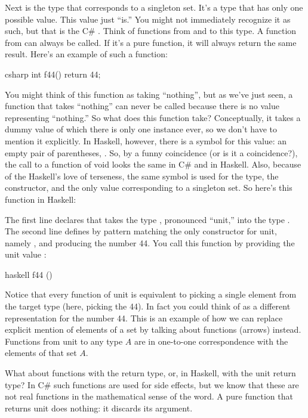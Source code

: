 Next is the type that corresponds to a singleton set. It's a type that
has only one possible value. This value just ``is.'' You might not
immediately recognize it as such, but that is the C\# .
Think of functions from and to this type. A function from 
can always be called. If it's a pure function, it will always return the
same result. Here's an example of such a function:

\begin{snip}{csharp}
int f44() { return 44; }
\end{snip}
You might think of this function as taking ``nothing'', but as we've
just seen, a function that takes ``nothing'' can never be called because
there is no value representing ``nothing.'' So what does this function
take? Conceptually, it takes a dummy value of which there is only one
instance ever, so we don't have to mention it explicitly. In Haskell,
however, there is a symbol for this value: an empty pair of parentheses,
\code{()}. So, by a funny coincidence (or is it a coincidence?), the
call to a function of void looks the same in C\# and in Haskell. Also,
because of the Haskell's love of terseness, the same symbol \code{()}
is used for the type, the constructor, and the only value corresponding
to a singleton set. So here's this function in Haskell:

The first line declares that  takes the type \code{()},
pronounced ``unit,'' into the type . The second line
defines  by pattern matching the only constructor for unit,
namely \code{()}, and producing the number 44. You call this function
by providing the unit value \code{()}:

\begin{snip}{haskell}
f44 ()
\end{snip}
Notice that every function of unit is equivalent to picking a single
element from the target type (here, picking the  44). In
fact you could think of  as a different representation for
the number 44. This is an example of how we can replace explicit mention
of elements of a set by talking about functions (arrows) instead.
Functions from unit to any type $A$ are in one-to-one correspondence with
the elements of that set $A$.

What about functions with the  return type, or, in Haskell,
with the unit return type? In C\# such functions are used for side
effects, but we know that these are not real functions in the
mathematical sense of the word. A pure function that returns unit does
nothing: it discards its argument.

